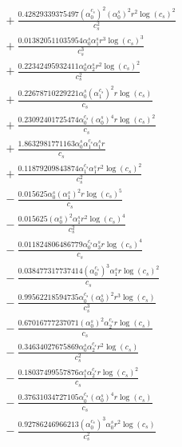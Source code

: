 \documentclass[10pt]{article}
\begin{document}
\begin{align*}
&{}  + \frac{0.42829339375497 \left(\alpha_{0}^{c_s}\right)^{2} \left(\alpha_{0}^s\right)^{2} r^{2} \log{\left(c_{s} \right)}^{2}}{c_{s}^{2}} \\
&{}  + \frac{0.013820511035954 \alpha_{0}^s \alpha_{1}^s r^{3} \log{\left(c_{s} \right)}^{3}}{c_{s}^{3}} \\
&{}  + \frac{0.22342495932411 \alpha_{0}^s \alpha_{2}^s r^{2} \log{\left(c_{s} \right)}^{2}}{c_{s}^{2}} \\
&{}  + \frac{0.22678710229221 \alpha_{0}^s \left(\alpha_{1}^{c_s}\right)^{2} r \log{\left(c_{s} \right)}}{c_{s}} \\
&{}  + \frac{0.23092401725474 \alpha_{0}^{c_s} \left(\alpha_{0}^s\right)^{4} r \log{\left(c_{s} \right)}^{2}}{c_{s}} \\
&{}  + \frac{1.8632981771163 \alpha_{0}^s \alpha_{1}^{c_s} \alpha_{1}^s r}{c_{s}} \\
&{}  + \frac{0.11879209843874 \alpha_{1}^{c_s} \alpha_{1}^s r^{2} \log{\left(c_{s} \right)}^{2}}{c_{s}^{2}} \\
&{}  - \frac{0.015625 \alpha_{0}^s \left(\alpha_{1}^s\right)^{2} r \log{\left(c_{s} \right)}^{5}}{c_{s}} \\
&{}  - \frac{0.015625 \left(\alpha_{0}^s\right)^{2} \alpha_{1}^s r^{2} \log{\left(c_{s} \right)}^{4}}{c_{s}^{2}} \\
&{}  - \frac{0.011824806486779 \alpha_{0}^{c_s} \alpha_{3}^s r \log{\left(c_{s} \right)}^{4}}{c_{s}} \\
&{}  - \frac{0.038477317737414 \left(\alpha_{0}^{c_s}\right)^{3} \alpha_{1}^s r \log{\left(c_{s} \right)}^{2}}{c_{s}} \\
&{}  - \frac{0.99562218594735 \alpha_{0}^{c_s} \left(\alpha_{0}^s\right)^{2} r^{3} \log{\left(c_{s} \right)}}{c_{s}^{3}} \\
&{}  - \frac{0.67016777237071 \left(\alpha_{0}^s\right)^{2} \alpha_{2}^{c_s} r \log{\left(c_{s} \right)}}{c_{s}} \\
&{}  - \frac{0.34634027675869 \alpha_{0}^s \alpha_{2}^{c_s} r^{2} \log{\left(c_{s} \right)}}{c_{s}^{2}} \\
&{}  - \frac{0.18037499557876 \alpha_{1}^s \alpha_{2}^{c_s} r \log{\left(c_{s} \right)}^{2}}{c_{s}} \\
&{}  - \frac{0.37631034727105 \alpha_{0}^{c_s} \left(\alpha_{0}^s\right)^{4} r \log{\left(c_{s} \right)}}{c_{s}} \\
&{}  - \frac{0.92786246966213 \left(\alpha_{0}^{c_s}\right)^{3} \alpha_{0}^s r^{2} \log{\left(c_{s} \right)}}{c_{s}^{2}} \\

\end{align*}
\end{document}
